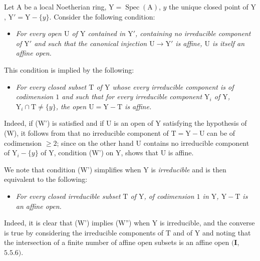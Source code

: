 \begin{env}[21.12.8]
\label{IV.21.12.8}
Let $\mathrm{A}$ be a local Noetherian ring, $\mathrm{Y}=\operatorname{Spec}(\mathrm{A})$, $y$ the unique closed point of $\mathrm{Y}$, $\mathrm{Y}'=\mathrm{Y}-\{y\}$.
Consider the following condition:
\begin{itemize}
  \item[\textup{(W)}] \emph{For every open $\mathrm{U}$ of $\mathrm{Y}$ contained in $\mathrm{Y}'$, containing no irreducible component of $\mathrm{Y}'$ and such that the canonical injection $\mathrm{U}\to\mathrm{Y}'$ is affine, $\mathrm{U}$ is itself an affine open.}
\end{itemize}

This condition is implied by the following:
\begin{itemize}
  \item[\textup{(W')}] \emph{For every closed subset $\mathrm{T}$ of $\mathrm{Y}$ whose every irreducible component is of codimension $1$ and such that for every irreducible component $\mathrm{Y}_i$ of $\mathrm{Y}$, $\mathrm{Y}_i\cap\mathrm{T}\neq\{y\}$, the open $\mathrm{U}=\mathrm{Y}-\mathrm{T}$ is affine.}
\end{itemize}

Indeed, if (W') is satisfied and if $\mathrm{U}$ is an open of $\mathrm{Y}$ satisfying the hypothesis of (W), it follows from  that no irreducible component of $\mathrm{T}=\mathrm{Y}-\mathrm{U}$ can be of codimension $\geq 2$; since on the other hand $\mathrm{U}$ contains no irreducible component of $\mathrm{Y}_i-\{y\}$ of $\mathrm{Y}$, condition (W') on $\mathrm{Y}$, shows that $\mathrm{U}$ is affine.

We note that condition (W') simplifies when $\mathrm{Y}$ is \emph{irreducible} and is then equivalent to the following:
\begin{itemize}
  \item[\textup{(W'')}] \emph{For every closed irreducible subset $\mathrm{T}$ of $\mathrm{Y}$, of codimension $1$ in $\mathrm{Y}$, $\mathrm{Y}-\mathrm{T}$ is an affine open.}
\end{itemize}

Indeed, it is clear that (W') implies (W'') when $\mathrm{Y}$ is irreducible, and the converse is true by considering the irreducible components of $\mathrm{T}$ and of $\mathrm{Y}$ and noting that the intersection of a finite number of affine open subsets is an affine open $(\mathbf{I}$, $5.5.6)$.
\end{env}

